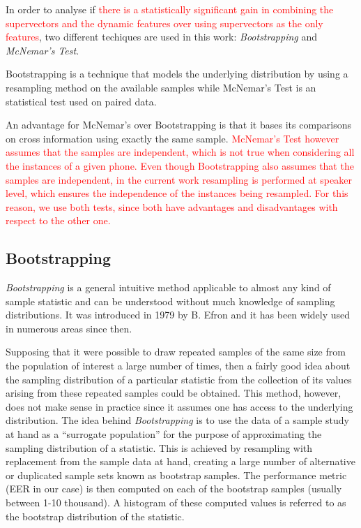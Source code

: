 In order to analyse if %
\textcolor{red}{there is a statistically significant gain in combining the
supervectors and the dynamic features
over using supervectors as the only features},
two different techiques are used in this work: \textit{Bootstrapping} and
\textit{McNemar's Test}.

Bootstrapping is a technique that models the underlying
distribution by using a resampling method on the available samples while McNemar's
Test is an statistical test used on paired data.

An advantage for McNemar's
over Bootstrapping is that it bases its comparisons on cross information using
exactly the same sample. \textcolor{red}{
  McNemar's Test however assumes that the samples
  are independent, which is not true when considering
  all the instances of a given phone. Even though Bootstrapping also assumes that
  the samples are independent, in the current work resampling is performed
  at speaker level, which ensures the independence of the instances being resampled.
  For this reason, we use both tests, since both have advantages and
  disadvantages with respect to the other one.
}

\subsection{Bootstrapping} \label{subsection:bootstrapping}

\textit{Bootstrapping} \cite{bootstrapping} is a general intuitive method applicable
to almost any kind of sample statistic and can be understood without much
knowledge of sampling distributions. It was introduced in 1979 by B. Efron and it has
been widely used in numerous areas since then.

Supposing that it were possible to draw repeated samples
of the same size from the population of interest a large number of times, then
a fairly good idea about the sampling distribution of a particular statistic from
the collection of its values arising from these repeated samples could be obtained.
This method, however, does not make sense in practice since it assumes one has access to the
underlying distribution.
The idea behind \textit{Bootstrapping} is to use the data of a sample study at hand as a
``surrogate population'' for the purpose of approximating the sampling distribution of
a statistic. This is achieved by resampling with replacement from the sample data
at hand, creating a large number of alternative or duplicated sample sets known as
bootstrap samples. The performance metric (EER in our case)
is then computed on each of the bootstrap
samples (usually between 1-10 thousand). A histogram of these computed
values is referred to as the bootstrap distribution of the statistic.

